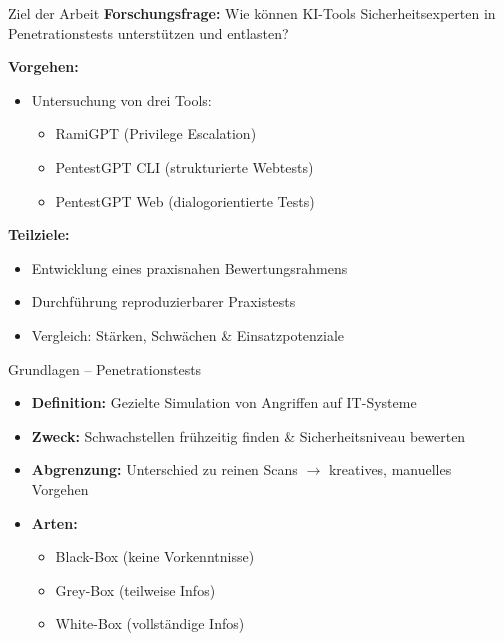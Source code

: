 \documentclass[
	aspectratio=169,	%
	onlytextwidth,		%
	t,					%
	]{beamer}
\begin{document}
\begin{frame}{Ziel der Arbeit}
	\textbf{Forschungsfrage:}  
	Wie können KI-Tools Sicherheitsexperten in Penetrationstests unterstützen und entlasten?	
	
	\textbf{Vorgehen:}
	\begin{itemize}
		\item Untersuchung von drei Tools:
		\begin{itemize}
			\item RamiGPT (Privilege Escalation)
			\item PentestGPT CLI (strukturierte Webtests)
			\item PentestGPT Web (dialogorientierte Tests)
		\end{itemize}
	\end{itemize}
	\textbf{Teilziele:}
	\begin{itemize}
		\item Entwicklung eines praxisnahen Bewertungsrahmens
		\item Durchführung reproduzierbarer Praxistests
		\item Vergleich: Stärken, Schwächen \& Einsatzpotenziale
	\end{itemize}
\end{frame}

\begin{frame}{Grundlagen – Penetrationstests}
	\begin{itemize}
		\item \textbf{Definition:} Gezielte Simulation von Angriffen auf IT-Systeme
		\item \textbf{Zweck:} Schwachstellen frühzeitig finden \& Sicherheitsniveau bewerten
		\item \textbf{Abgrenzung:} Unterschied zu reinen Scans $\rightarrow$ kreatives, manuelles Vorgehen
		\item \textbf{Arten:}
		\begin{itemize}
			\item Black-Box (keine Vorkenntnisse)
			\item Grey-Box (teilweise Infos)
			\item White-Box (vollständige Infos)
		\end{itemize}
	\end{itemize}
\end{frame}
\end{document}
